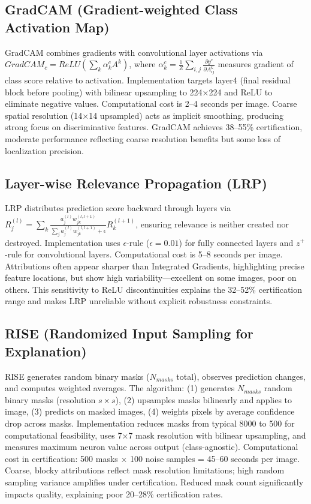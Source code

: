 \documentclass[11pt]{article}
\begin{document}
\subsection{GradCAM (Gradient-weighted Class Activation Map)}

GradCAM combines gradients with convolutional layer activations via $GradCAM_c = ReLU\left(\sum_k \alpha_k^c A^k\right)$, where $\alpha_k^c = \frac{1}{Z} \sum_{i,j} \frac{\partial y^c}{\partial A_{ij}^k}$ measures gradient of class score relative to activation. Implementation targets layer4 (final residual block before pooling) with bilinear upsampling to 224×224 and ReLU to eliminate negative values. Computational cost is 2–4 seconds per image. Coarse spatial resolution (14×14 upsampled) acts as implicit smoothing, producing strong focus on discriminative features. GradCAM achieves 38–55\% certification, moderate performance reflecting coarse resolution benefits but some loss of localization precision.

\subsection{Layer-wise Relevance Propagation (LRP)}

LRP distributes prediction score backward through layers via $R_j^{(l)} = \sum_k \frac{a_j^{(l)} w_{jk}^{(l,l+1)}}{\sum_j a_j^{(l)} w_{jk}^{(l,l+1)} + \epsilon} R_k^{(l+1)}$, ensuring relevance is neither created nor destroyed. Implementation uses $\epsilon$-rule ($\epsilon=0.01$) for fully connected layers and $z^+$-rule for convolutional layers. Computational cost is 5–8 seconds per image. Attributions often appear sharper than Integrated Gradients, highlighting precise feature locations, but show high variability—excellent on some images, poor on others. This sensitivity to ReLU discontinuities explains the 32–52\% certification range and makes LRP unreliable without explicit robustness constraints.

\subsection{RISE (Randomized Input Sampling for Explanation)}

RISE generates random binary masks ($N_{masks}$ total), observes prediction changes, and computes weighted averages. The algorithm: (1) generates $N_{masks}$ random binary masks (resolution $s \times s$), (2) upsamples masks bilinearly and applies to image, (3) predicts on masked images, (4) weights pixels by average confidence drop across masks. Implementation reduces masks from typical 8000 to 500 for computational feasibility, uses 7×7 mask resolution with bilinear upsampling, and measures maximum neuron value across output (class-agnostic). Computational cost in certification: 500 masks × 100 noise samples = 45–60 seconds per image. Coarse, blocky attributions reflect mask resolution limitations; high random sampling variance amplifies under certification. Reduced mask count significantly impacts quality, explaining poor 20–28\% certification rates.
\end{document}
